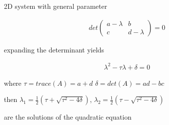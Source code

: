 \documentclass[9pt,aspectratio=43,mathserif,table]{beamer}
\begin{document}
\begin{frame}{2D system with general parameter}
\begin{multicols}{2}
    \begin{equation*}
      \begin{aligned}
        det
        \begin{pmatrix}
          a-\lambda & b\\
          c & d-\lambda
        \end{pmatrix}
         = 0
      \end{aligned}
    \end{equation*}

    expanding the determinant yields

    \begin{equation}
      \begin{aligned}
        \lambda^2 - \tau\lambda + \delta = 0
      \end{aligned}
    \end{equation}

    where 
    $\tau = trace(A) = a + d$
    $\delta = det(A) = ad - bc$

    then
    $\lambda_1 = \frac{ 1}{2} (\tau + \sqrt{\tau ^2 - 4\delta})$,
    $\lambda_2 = \frac{ 1}{2} (\tau - \sqrt{\tau ^2 - 4\delta})$
    
    are the solutions of the quadratic equation
    
  \end{multicols}
\end{frame}
\end{document}
